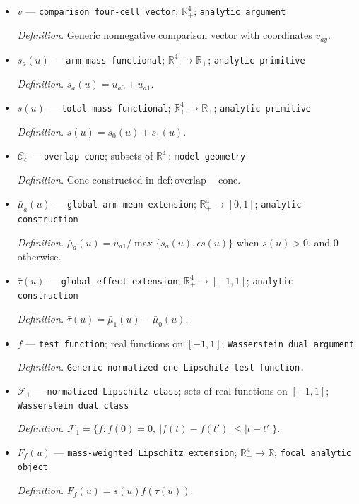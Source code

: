 \documentclass{article}
\begin{document}
\begin{itemize}
  \item \(v\) --- \texttt{comparison four-\allowbreak{}cell vector}; \(\mathbb R_+^4\); \texttt{analytic argument}
  \par\smallskip\noindent\emph{Definition.} Generic nonnegative comparison vector with coordinates \(v_{ay}\).
  \item \(s_a(u)\) --- \texttt{arm-\allowbreak{}mass functional}; \(\mathbb R_+^4\to\mathbb R_+\); \texttt{analytic primitive}
  \par\smallskip\noindent\emph{Definition.} \(s_a(u)=u_{a0}+u_{a1}\).
  \item \(s(u)\) --- \texttt{total-\allowbreak{}mass functional}; \(\mathbb R_+^4\to\mathbb R_+\); \texttt{analytic primitive}
  \par\smallskip\noindent\emph{Definition.} \(s(u)=s_0(u)+s_1(u)\).
  \item \(\mathcal C_\epsilon\) --- \texttt{overlap cone}; subsets of \(\mathbb R_+^4\); \texttt{model geometry}
  \par\smallskip\noindent\emph{Definition.} Cone constructed in \(\mathrm{def:overlap-cone}\).
  \item \(\bar\mu_a(u)\) --- \texttt{global arm-\allowbreak{}mean extension}; \(\mathbb R_+^4\to[0,1]\); \texttt{analytic construction}
  \par\smallskip\noindent\emph{Definition.} \(\bar\mu_a(u)=u_{a1}/\max\{s_a(u),\epsilon s(u)\}\) when \(s(u)>0\), and \(0\) otherwise.
  \item \(\bar\tau(u)\) --- \texttt{global effect extension}; \(\mathbb R_+^4\to[-1,1]\); \texttt{analytic construction}
  \par\smallskip\noindent\emph{Definition.} \(\bar\tau(u)=\bar\mu_1(u)-\bar\mu_0(u)\).
  \item \(f\) --- \texttt{test function}; real functions on \([-1,1]\); \texttt{Wasserstein dual argument}
  \par\smallskip\noindent\emph{Definition.} \texttt{Generic normalized one-\allowbreak{}Lipschitz test function.}
  \item \(\mathcal F_1\) --- \texttt{normalized Lipschitz class}; sets of real functions on \([-1,1]\); \texttt{Wasserstein dual class}
  \par\smallskip\noindent\emph{Definition.} \(\mathcal F_1=\{f:f(0)=0,\ |f(t)-f(t')|\le |t-t'|\}\).
  \item \(F_f(u)\) --- \texttt{mass-\allowbreak{}weighted Lipschitz extension}; \(\mathbb R_+^4\to\mathbb R\); \texttt{focal analytic object}
  \par\smallskip\noindent\emph{Definition.} \(F_f(u)=s(u)f(\bar\tau(u))\).

\end{itemize}
\end{document}
